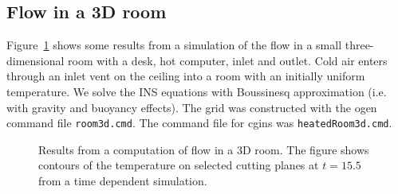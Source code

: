 \subsection{Flow in a 3D room} \label{sec:heatedRoom3d}

Figure~\ref{fig:room3dFlow} shows some results from a 
simulation of the flow in a small three-dimensional
room with a desk, hot computer, inlet and outlet. 
Cold air enters through an inlet vent on the ceiling into a room with an initially
uniform temperature.  We solve the INS equations with
Boussinesq approximation (i.e. with gravity and buoyancy effects). 
The grid was constructed with the ogen command file {\tt room3d.cmd}. The
command file for cgins was {\tt heatedRoom3d.cmd}.

%
{
\begin{figure}[hbt]
\newcommand{\figWidtha}{7cm}
\newcommand{\trimfig}[2]{\trimFig{#1}{#2}{0.1}{0.25}{.05}{.175}}
\begin{center}
\end{center}
\caption{Results from a computation of flow in a 3D room. The figure shows contours of the temperature on selected
cutting planes at $t=15.5$ from a time dependent simulation. }
\label{fig:room3dFlow}
\end{figure}
}